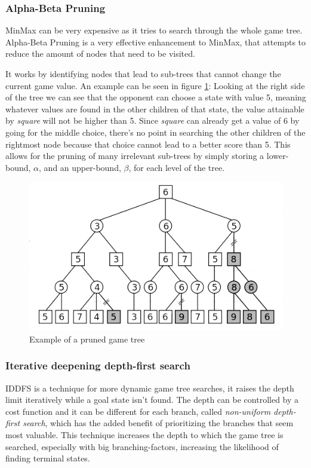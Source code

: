 \subsubsection{Alpha-Beta Pruning}

MinMax can be very expensive as it tries to search through the whole game tree. Alpha-Beta Pruning is a very effective enhancement to MinMax, that attempts to reduce the amount of nodes that need to be visited. 

It works by identifying nodes that lead to sub-trees that cannot change the current game value.
An example can be seen in figure \ref{fig:alpha_beta}: Looking at the right side of the tree we can see that the opponent can choose a state with value 5, meaning whatever values are found in the other children of that state, the value attainable by \textit{square} will not be higher than 5. Since \textit{square} can already get a value of 6 by going for the middle choice, there's no point in searching the other children of the rightmost node because that choice cannot lead to a better score than 5.
This allows for the pruning of many irrelevant sub-trees by simply storing a lower-bound, $\alpha$, and an upper-bound, $\beta$, for each level of the tree.

\begin{figure}[h]
	\centering
    \includegraphics[scale=0.8]{images/alpha_beta.png}
    \caption{Example of a pruned game tree}
    \label{fig:alpha_beta}
\end{figure}

\subsubsection{Iterative deepening depth-first search}

\gls{IDDFS} is a technique for more dynamic game tree searches, it raises the depth limit iteratively while a goal state isn't found. The depth can be controlled by a cost function and it can be different for each branch, called \textit{non-uniform depth-first search}, which has the added benefit of prioritizing the branches that seem most valuable.
This technique increases the depth to which the game tree is searched, especially with big branching-factors, increasing the likelihood of finding terminal states.


